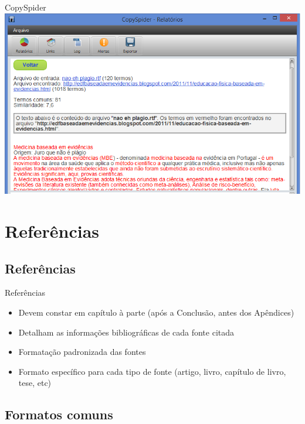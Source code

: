 \documentclass{beamer}
\begin{document}
\begin{frame}{CopySpider}
  \includegraphics[width=\textwidth]{Referencias/copyspider4}
\end{frame}

\section{Referências}

\subsection{Referências}

\begin{frame}{Referências}
  \begin{itemize}
  \item Devem constar em capítulo à parte (após a Conclusão, antes dos
    Apêndices)
  \item Detalham as informações bibliográficas de cada fonte citada
  \item Formatação padronizada das fontes
  \item Formato específico para cada tipo de fonte (artigo, livro,
    capítulo de livro, tese, etc)
  \end{itemize}
\end{frame}
\subsection{Formatos comuns}
\end{document}
